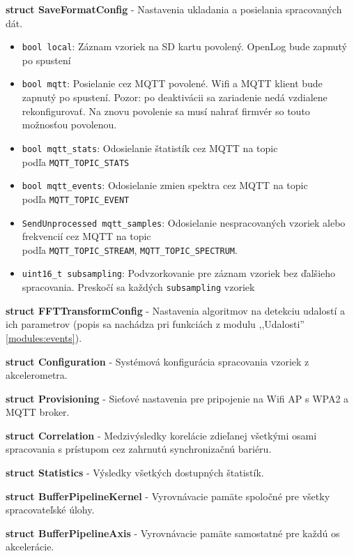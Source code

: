 \noindent\textbf{struct SaveFormatConfig} - Nastavenia ukladania a posielania spracovaných dát.
\begin{itemize}[noitemsep, topsep=0pt]
	\item \verb|bool local|: Záznam vzoriek na SD kartu povolený. OpenLog bude zapnutý po spustení
	\item \verb|bool mqtt|: Posielanie cez MQTT povolené. Wifi a MQTT klient bude zapnutý po spustení. Pozor: po deaktivácii
	sa zariadenie nedá vzdialene rekonfigurovať. Na znovu povolenie sa musí nahrať firmvér so touto možnosťou povolenou. 
	\item \verb|bool mqtt_stats|: Odosielanie štatistík cez MQTT na topic \\ podľa \verb|MQTT_TOPIC_STATS|
	\item \verb|bool mqtt_events|:  Odosielanie zmien spektra cez MQTT na topic \\ podľa \verb|MQTT_TOPIC_EVENT|
	\item \verb|SendUnprocessed mqtt_samples|:  Odosielanie nespracovaných vzoriek alebo frekvencií cez MQTT na topic \\ podľa \verb|MQTT_TOPIC_STREAM|, \verb|MQTT_TOPIC_SPECTRUM|.
	\item \verb|uint16_t subsampling|: Podvzorkovanie pre záznam vzoriek bez ďalšieho spracovania. Preskočí sa každých \verb|subsampling| vzoriek
\end{itemize}
\bigbreak

\noindent\textbf{struct FFTTransformConfig} - Nastavenia algoritmov na detekciu udalostí a ich parametrov (popis sa nachádza pri 
funkciách z modulu ,,Udalosti'' \ref{modules:events}).
\bigbreak

\noindent\textbf{struct Configuration} - Systémová konfigurácia spracovania vzoriek z akcelerometra.
\bigbreak

\noindent\textbf{struct Provisioning} - Sieťové nastavenia pre pripojenie na Wifi AP s WPA2 a MQTT broker.
\bigbreak

\noindent\textbf{struct Correlation} - Medzivýsledky korelácie zdieľanej všetkými osami spracovania s prístupom
cez zahrnutú synchronizačnú bariéru.
\bigbreak

\noindent\textbf{struct Statistics} - Výsledky všetkých dostupných štatistík.
\bigbreak

\noindent\textbf{struct BufferPipelineKernel} - Vyrovnávacie pamäte spoločné pre všetky spracovateľské úlohy.
\bigbreak

\noindent\textbf{struct BufferPipelineAxis} - Vyrovnávacie pamäte samostatné pre každú os akcelerácie.
\bigbreak

